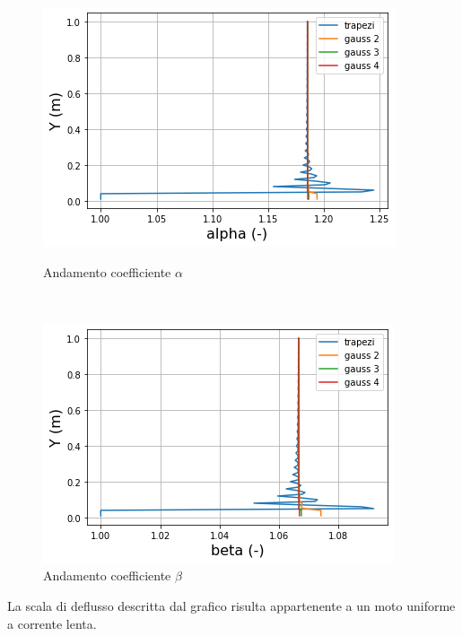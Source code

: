 \documentclass[12pt]{article} %
\begin{document}
\begin{figure}[H]
\begin{minipage}[b]{8.5cm}
\centering
    \includegraphics[width=1 \textwidth]{alphatri.png}
    \caption{Andamento coefficiente $\alpha$}
    \label{fig:triangolare_alfa}
\end{minipage}
\ \hspace{2mm} \hspace{3mm} \
\begin{minipage}[b]{8.5cm}
    \centering
    \includegraphics[width=1 \textwidth]{betatri.png}
    \caption{Andamento coefficiente $\beta$}
    \label{fig:triangolare_beta}
\end{minipage}
\end{figure}

\noindent La scala di deflusso descritta dal grafico risulta appartenente a un moto uniforme a corrente lenta. 
\end{document}
